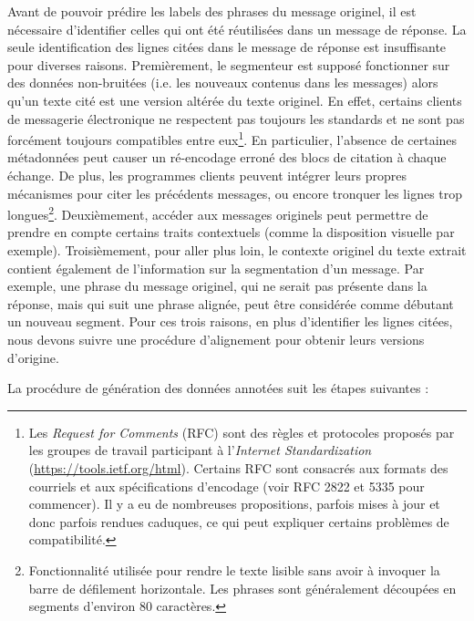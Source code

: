 Avant de pouvoir prédire les labels des phrases du message originel, il est nécessaire d'identifier celles qui ont été réutilisées dans un message de réponse. La seule identification des lignes citées dans le message de réponse est insuffisante pour diverses raisons. Premièrement, le segmenteur est supposé fonctionner sur des données non-bruitées (i.e. les nouveaux contenus dans les messages) alors qu'un texte cité est une version altérée du texte originel. En effet, certains clients de messagerie électronique ne respectent pas toujours les standards et ne sont pas forcément toujours compatibles entre eux\footnote{Les \textit{Request for Comments} (RFC) sont des règles et protocoles proposés par les groupes de travail participant à l'\textit{Internet Standardization} (\url{https://tools.ietf.org/html}). Certains RFC sont consacrés aux formats des courriels et aux spécifications d'encodage (voir RFC 2822 et 5335 pour commencer). Il y a eu de nombreuses propositions, parfois mises à jour et donc parfois rendues caduques, ce qui peut expliquer certains problèmes de compatibilité.}. En particulier, l'absence de certaines métadonnées peut causer un ré-encodage erroné des blocs de citation à chaque échange. De plus, les programmes clients peuvent intégrer leurs propres mécanismes pour citer les précédents messages, ou encore tronquer les lignes trop longues\footnote{Fonctionnalité utilisée pour rendre le texte lisible sans avoir à invoquer la barre de défilement horizontale. Les phrases sont généralement découpées en segments d'environ 80 caractères.}. Deuxièmement, accéder aux messages originels peut permettre de prendre en compte certains traits contextuels (comme la disposition visuelle par exemple). Troisièmement, pour aller plus loin, le contexte originel du texte extrait contient également de l'information sur la segmentation d'un message. Par exemple, une phrase du message originel, qui ne serait pas présente dans la réponse, mais qui suit une phrase alignée, peut être considérée comme débutant un nouveau segment. Pour ces trois raisons, en plus d'identifier les lignes citées, nous devons suivre une procédure d'alignement pour obtenir leurs versions d'origine. 

La procédure de génération des données annotées suit les étapes suivantes :

